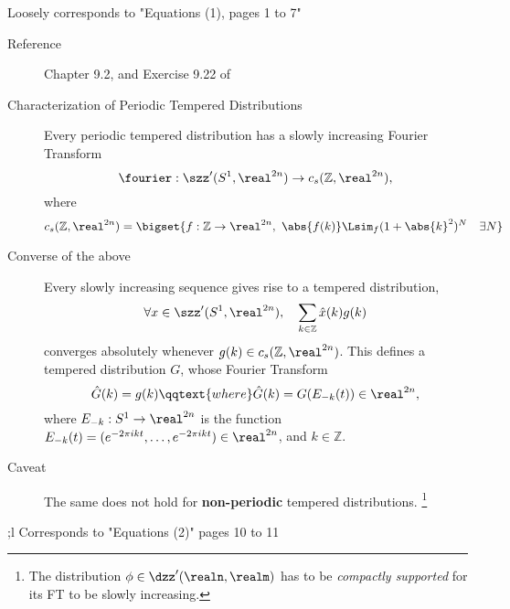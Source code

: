 \documentclass[../main-v2-manifolds.tex]{subfiles}
\begin{document}
Loosely corresponds to "Equations (1), pages 1 to 7"
\begin{description}
    \item[Reference] Chapter 9.2, and Exercise 9.22 of \cite{Folland2013Real}
    \item[Characterization of Periodic Tempered Distributions] Every periodic tempered distribution has a slowly increasing Fourier Transform
    \[
    \fourier: \szz'(S^1, \realtn)\to c_s(\mathbb{Z},\realtn),
    \]
    where
    \[  
        c_s(\mathbb{Z},\realtn) = \bigset{f:\mathbb{Z}\to\realtn,\ \abs{f(k)}\Lsim_{f} (1+\abs{k}^2)^{N}\quad \exists N}
    \]
    \item[Converse of the above]
    Every slowly increasing sequence gives rise to a tempered distribution,
    \[
        \forall x\in \szz'(S^1,\realtn),\quad \sum_{k\in\mathbb{Z}}\hat{x}(k)g(k)
    \]
    converges absolutely whenever $g(k)\in c_s(\mathbb{Z},\realtn)$. This defines a tempered distribution $G$, whose Fourier Transform 
    \[
        \hat{G}(k) = g(k)\qqtext{where}\hat{G}(k) = G(E_{-k}(t))\in \realtn,
    \]
    where $E_{-k}:S^1\to\realtn$ is the function $E_{-k}(t) = (e^{-2\pi i k t}, \ldots, e^{-2\pi i k t})\in\realtn$, and $k\in\mathbb{Z}$.
    \item[Caveat] The same does not hold for \textbf{non-periodic} tempered distributions. \footnote{The distribution $\phi\in\dzz'(\realn,\realm)$ has to be \emph{compactly supported} for its FT to be slowly increasing.}
\end{description}
;l
Corresponds to "Equations (2)" pages 10 to 11
\end{document}
